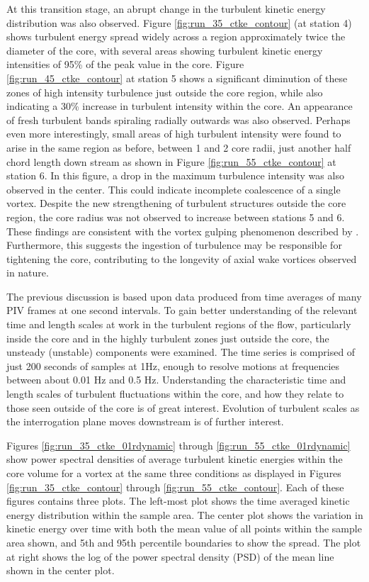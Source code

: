 At this transition stage, an abrupt change in the turbulent 
kinetic energy distribution was also observed. Figure 
\ref{fig:run_35_ctke_contour} (at station 4) shows turbulent energy spread 
widely across a region approximately twice the diameter of the core, with 
several areas showing turbulent kinetic energy intensities of 95\% of the peak 
value in the core. Figure \ref{fig:run_45_ctke_contour} at station 5 shows a 
significant diminution of these zones of high intensity turbulence just outside 
the core region, while also indicating a 30\% increase in turbulent intensity 
within the core. An appearance of fresh turbulent bands spiraling radially
outwards was also observed. Perhaps even more interestingly, small areas of 
high turbulent intensity were found to arise in the same region as before, 
between 1 and 2 core radii, just another half chord length down stream as shown 
in Figure \ref{fig:run_55_ctke_contour} at station 6. In this figure, a drop 
in the maximum turbulence intensity was also observed in the center. This could 
indicate incomplete coalescence of a single vortex. Despite 
the new strengthening of turbulent structures outside the core region, the core 
radius was not observed to increase between stations 5 and 6. These findings 
are consistent with the vortex gulping phenomenon described by 
\cite{bandyopadhyay1991}. Furthermore, this suggests the ingestion of 
turbulence may be responsible for tightening the core, contributing to the 
longevity of axial wake vortices observed in nature.





The previous discussion is based upon data produced from time averages of many 
PIV frames at one second intervals. To gain better understanding of the 
relevant time and 
length scales at work in the turbulent regions of the flow, particularly inside 
the core and in the highly turbulent zones just outside the core, the unsteady 
(unstable) components were examined. The time series is comprised of just 200 
seconds of samples at 1Hz, enough to resolve motions at frequencies between 
about 0.01 Hz and 0.5 Hz. Understanding the characteristic time and length 
scales of turbulent fluctuations within the core, and how they relate to those 
seen outside of the core is of great interest. Evolution of turbulent scales as 
the interrogation plane moves downstream is of further interest. 

Figures \ref{fig:run_35_ctke_01rdynamic} through 
\ref{fig:run_55_ctke_01rdynamic} show power spectral densities of 
average turbulent kinetic energies within the core volume for a vortex at the 
same three conditions as displayed in Figures \ref{fig:run_35_ctke_contour} 
through \ref{fig:run_55_ctke_contour}. Each of these figures contains three 
plots. The left-most plot shows the time averaged kinetic energy distribution 
within the sample area. The center plot shows the variation in kinetic energy 
over time with both the mean value of all points within the sample area shown, 
and 5th and 95th percentile boundaries to show the spread. The plot at right 
shows the log of the power spectral density (PSD) of the mean line shown in the 
center plot. 

